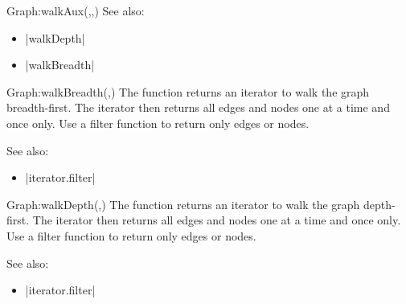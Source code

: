 \begin{luacommand}{{Graph:walkAux}(,,)}
See also:
\begin{itemize}
	\item[] |walkDepth|\item[] |walkBreadth|
\end{itemize}

\end{luacommand}\begin{luacommand}{{Graph:walkBreadth}(,)}
The function returns an iterator to walk the graph breadth-first. The iterator then returns all edges and nodes one at a time and once only.  Use a filter function to return only edges or nodes.



See also:
\begin{itemize}
	\item[] |iterator.filter|
\end{itemize}

\end{luacommand}\begin{luacommand}{{Graph:walkDepth}(,)}
The function returns an iterator to walk the graph depth-first. The iterator then returns all edges and nodes one at a time and once only.  Use a filter function to return only edges or nodes.



See also:
\begin{itemize}
	\item[] |iterator.filter|
\end{itemize}

\end{luacommand}

